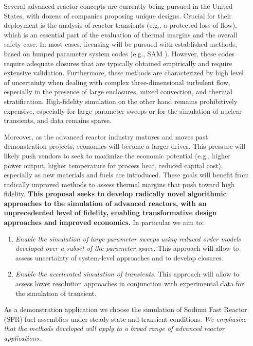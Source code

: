 Several  advanced reactor concepts are currently being pursued in the United
States, with dozens of companies proposing unique designs. Crucial for their
deployment is the analysis of  reactor transients (e.g., a protected loss of
flow), which is an essential part of the evaluation of thermal margins and the overall
safety case.  In most cases, licensing will be pursued with established
methods, based on lumped parameter system codes (e.g., SAM \cite{hu2021}).
However, these codes require adequate closures that are typically obtained
empirically and require extensive validation. Furthermore, these methods are
characterized by high level of uncertainty when dealing with complex
three-dimensional turbulent flow, especially in the presence of large
enclosures, mixed convection, and thermal stratification. High-fidelity
simulation on the other hand remains prohibitively expensive, especially for
large parameter sweeps or for the simulation of nuclear transients, and data
remains sparse.

Moreover, as the advanced reactor industry matures and moves past demonstration
projects, economics will become a larger driver. This pressure will likely push
vendors to seek to maximize the economic potential (e.g., higher power output,
higher temperature for process heat, reduced capital cost), especially as new
materials and fuels are introduced. These goals will benefit from radically
improved methods to assess thermal margins that push toward high fidelity.
\textbf{This proposal seeks to develop radically novel algorithmic approaches
to the simulation of advanced reactors, with an unprecedented level of
fidelity, enabling transformative design approaches and improved economics.} 
In particular we aim to: 
\begin{enumerate}
%
   \item \textit{Enable the simulation of large parameter sweeps using reduced
   order models developed over a subset of the parameter space.} This approach
   will allow to assess uncertainty of system-level approaches and to develop
   closures.
%
   \item \textit{Enable the accelerated simulation of transients.}
   This approach will allow to assess lower resolution approaches in conjunction
   with experimental data for the simulation of transient.  
\end{enumerate}
As a demonstration application we choose the simulation of Sodium Fast Reactor
(SFR) fuel assemblies under steady-state and transient conditions. \textit{We
emphasize that the methods developed will apply to a broad range of advanced
reactor applications.}

